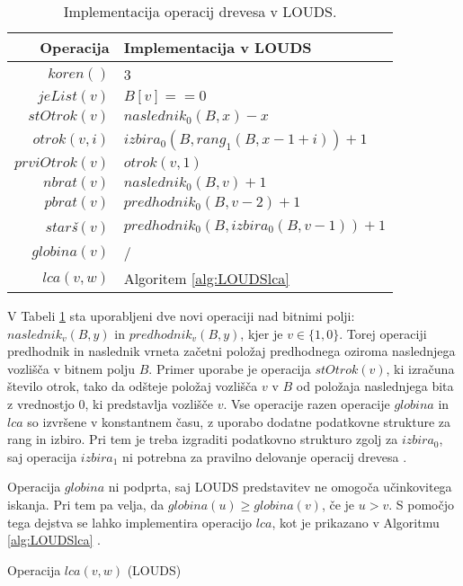 \begin{table}[htb]
    \centering
    \caption{Implementacija operacij drevesa v LOUDS.}
    \begin{tabular}{r|l}
\textbf{Operacija}& \textbf{Implementacija v LOUDS} \\\hline
         $koren()$& 3\\
         $jeList(v)$& $B[v]==0$\\
         $stOtrok(v)$& $naslednik_0(B,x)-x$\\
         $otrok(v,i)$& $izbira_0(B, rang_1(B, x - 1 + i))+1$\\
         $prviOtrok(v)$& $otrok(v,1)$\\
         $nbrat(v)$& $naslednik_0(B,v)+1$ \\
         $pbrat(v)$& $predhodnik_0(B,v-2)+1$ \\
         $star$\textit{š}$(v)$& $predhodnik_0(B,izbira_0(B,v-1))+1$ \\
         $globina(v)$& / \\
         $lca(v,w)$&  Algoritem \ref{alg:LOUDSlca}\\

    \end{tabular}
    \label{tab:LOUDSop}
\end{table}



V Tabeli \ref{tab:LOUDSop} sta uporabljeni dve novi operaciji nad bitnimi polji: $naslednik_v(B,y)$ in $predhodnik_v(B,y)$, kjer je $v\in \{1,0\}$. 
Torej operaciji predhodnik in naslednik vrneta začetni položaj predhodnega oziroma naslednjega vozlišča v bitnem polju $B$. Primer uporabe je operacija $stOtrok(v)$, ki izračuna število otrok, tako da odšteje položaj vozlišča $v$ v $B$ od položaja naslednjega bita z vrednostjo 0, ki predstavlja vozlišče $v$. Vse operacije razen operacije $globina$ in $lca$ so izvršene v konstantnem času, z uporabo dodatne podatkovne strukture za rang in izbiro. Pri tem je treba izgraditi podatkovno strukturo zgolj za $izbira_0$, saj operacija $izbira_1$ ni potrebna za pravilno delovanje operacij drevesa \cite{Navarro2016}.

Operacija $globina$ ni podprta, saj LOUDS predstavitev ne omogoča učinkovitega iskanja. Pri tem pa velja, da $globina(u)\ge globina(v)$, če je $u>v$. S pomočjo tega dejstva se lahko implementira operacijo $lca$, kot je prikazano v Algoritmu \ref{alg:LOUDSlca} \cite{Navarro2016}.
 
\begin{algorithm}[hbt]

\caption{Operacija $lca(v,w)$ (LOUDS)}\label{alg:LOUDSlca}
{
    
}
\end{algorithm}

